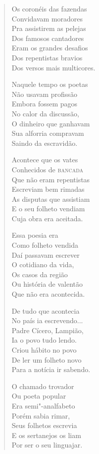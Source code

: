 \begin{verse}
Os coronéis das fazendas \\
Convidavam moradores \\
Pra assistirem as pelejas \\
Dos famosos cantadores \\
Eram os grandes desafios \\
Dos repentistas bravios \\
Dos versos mais multicores. 

Naquele tempo os poetas \\
Não usavam profissão \\
Embora fossem pagos \\
No calor da discussão, \\
O dinheiro que ganhavam \\
Sua alforria compravam \\
Saindo da escravidão. 

Acontece que os vates \\
Conhecidos de \textsc{bancada} \\
Que não eram repentistas \\
Escreviam bem rimadas \\
As disputas que assistiam \\
E o seu folheto vendiam \\
Cuja obra era aceitada. 
\pagebreak

Essa poesia era \\
Como folheto vendida \\
Daí passavam escrever \\
O cotidiano da vida, \\
Os casos da região \\
Ou história de valentão \\
Que não era acontecida. 

De tudo que acontecia \\
No país ia escrevendo... \\
Padre Cícero, Lampião, \\
Ia o povo tudo lendo. \\
Criou hábito no povo \\
De ler um folheto novo \\
Para a notícia ir sabendo. 

O chamado trovador \\
Ou poeta popular \\
Era semi"-analfabeto \\
Porém sabia rimar, \\
Seus folhetos escrevia \\
E os sertanejos os liam \\
Por ser o seu linguajar. 


\end{verse}
